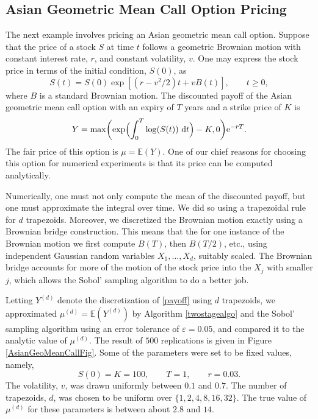 \documentclass[graybox]{svmult}
\newcommand{\me}{\ensuremath{\mathrm{e}}} %
\newcommand\e{\mathbb{E}}
\newcommand{\rd}{\,\mathrm{d}}
\newcommand{\dif}{\rd}
\begin{document}
\subsection{Asian Geometric Mean Call Option Pricing}

The next example involves pricing an Asian geometric mean call option.  Suppose that the price of a stock $S$ at time $t$ follows a geometric Brownian motion with constant interest rate, $r$, and constant volatility, $v$.  One may express the stock price in terms of the initial condition, $S(0)$, as 
\[
S(t)=S(0) \exp[(r-v^2/2)t + v B(t)], \qquad t \ge 0,
\]
where $B$ is a standard Brownian motion.  The discounted payoff of the Asian geometric mean call option with an expiry of $T$ years and a strike price of $K$ is 
\begin{equation} \label{payoff}
Y=\max\biggl(\exp\Bigl(\int_0^T \log(S(t)) \, \dif t \Bigr) - K,0 \biggr)\me^{-rT}.
\end{equation}
The fair price of this option is $\mu=\e(Y)$. One of our chief reasons for choosing this option for numerical experiments is that its price can be computed analytically.

Numerically, one must not only compute the mean of the discounted payoff, but one must approximate the integral over time.  We did so using a trapezoidal rule for $d$ trapezoids.  Moreover, we discretized the Brownian motion exactly using a Brownian bridge construction.  This means that the for one instance of the Brownian motion we first compute $B(T)$, then $B(T/2)$, etc., using independent Gaussian random variables $X_1, \ldots, X_d$, suitably scaled. The Brownian bridge accounts for more of the motion of the stock price into the $X_j$ with smaller $j$, which allows the Sobol' sampling algorithm to do a better job.  

Letting $Y^{(d)}$ denote the discretization of \eqref{payoff} using $d$ trapezoids, we approximated $\mu^{(d)}=\e(Y^{(d)})$ by Algorithm \ref{twostagealgo} and the Sobol' sampling algorithm using an error tolerance of $\varepsilon=0.05$, and compared it to the analytic value of $\mu^{(d)}$.  The result of $500$ replications is given in Figure \ref{AsianGeoMeanCallFig}.  Some of the parameters were set to be fixed values, namely,
\[
S(0)=K=100, \qquad T=1, \qquad r=0.03.
\]
The volatility, $v$, was drawn uniformly between $0.1$ and $0.7$.  The number of trapezoids, $d$, was chosen to be uniform over $\{1, 2, 4, 8, 16, 32\}$.  The true value of $\mu^{(d)}$ for these parameters is between about $2.8$ and $14$.
\end{document}
